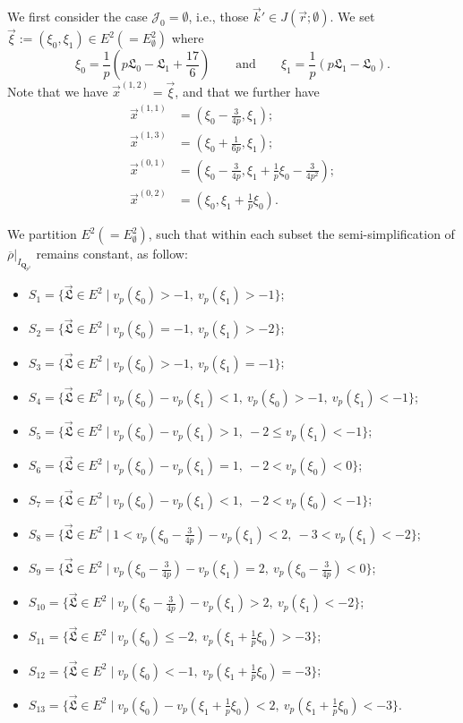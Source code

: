 \documentclass[11pt]{amsart}
\theoremstyle{definition}
\numberwithin{equation}{subsection}
\theoremstyle{plain}
\theoremstyle{plain}
\theoremstyle{plain}
\theoremstyle{plain}
\theoremstyle{plain}
\theoremstyle{plain}
\theoremstyle{plain}
\theoremstyle{plain}
\theoremstyle{plain}
\theoremstyle{plain}
\theoremstyle{plain}
\theoremstyle{plain}
\theoremstyle{definition}
\theoremstyle{definition}
\theoremstyle{definition}
\theoremstyle{remark}
\renewcommand{\(}{\textup{(}}
\renewcommand{\)}{\textup{)}}
\newcommand{\Q}{\mathbf{Q}}
\newcommand{\rhobar}{\overline{\rho}}
\newcommand{\fL}{\mathfrak{L}}
\newcommand{\cJ}{\mathcal{J}}
\newcommand{\vx}{\vec{x}}
\newcommand{\vr}{\vec{r}}
\newcommand{\vL}{\vec{\fL}}
\newcommand{\vk}{\vec{k}}
\begin{document}
We first consider the case $\cJ_0=\emptyset$, i.e., those $\vk'\in J(\vr;\emptyset)$. We set $\vec{\xi}:=(\xi_0,\xi_1)\in E^2(=E^2_\emptyset)$ where
$$\xi_0=\frac{1}{p}\left(p\fL_0-\fL_1+\frac{17}{6}\right) \qquad\mbox{and}\qquad \xi_1=\frac{1}{p}(p\fL_1-\fL_0).$$
Note that we have $\vx^{(1,2)}=\vec{\xi}$, and that we further have
\begin{align*}
\vx^{(1,1)}&=\left(\xi_0-\tfrac{3}{4p},\xi_1\right);\\
\vx^{(1,3)}&=\left(\xi_0+\tfrac{1}{6p},\xi_1\right);\\ 
\vx^{(0,1)}&=\left(\xi_0-\tfrac{3}{4p},\xi_1+\tfrac{1}{p}\xi_0-\tfrac{3}{4p^2}\right);\\
\vx^{(0,2)}&=\left(\xi_0,\xi_1+\tfrac{1}{p}\xi_0\right).
\end{align*}

We partition $E^2(=E^2_\emptyset)$, such that within each subset the semi-simplification of $\rhobar|_{I_{\Q_{p^2}}}$ remains constant, as follow:
\begin{itemize}[leftmargin=*]
\item $S_1=\{\vL\in E^2\mid v_p(\xi_0)>-1,\ v_p(\xi_1)>-1\}$;
\item $S_2=\{\vL\in E^2\mid v_p(\xi_0)=-1,\ v_p(\xi_1)>-2\}$;
\item $S_3=\{\vL\in E^2\mid v_p(\xi_0)>-1,\ v_p(\xi_1)=-1\}$;
\item $S_4=\{\vL\in E^2\mid  v_p(\xi_0)-v_p(\xi_1)<1,\ v_p(\xi_0)>-1,\ v_p(\xi_1)<-1\}$;
\item $S_5=\{\vL\in E^2\mid v_p(\xi_0)-v_p(\xi_1)>1,\ -2\leq v_p(\xi_1)<-1\}$;
\item $S_6=\{\vL\in E^2\mid v_p(\xi_0)-v_p(\xi_1)=1,\ -2<v_p(\xi_0)<0\}$;
\item $S_7=\{\vL\in E^2\mid v_p(\xi_0)-v_p(\xi_1)<1,\ -2<v_p(\xi_0)<-1\}$;
\item $S_8=\{\vL\in E^2\mid 1<v_p(\xi_0-\tfrac{3}{4p})-v_p(\xi_1)<2,\ -3<v_p(\xi_1)<-2\}$;
\item $S_9=\{\vL\in E^2\mid v_p(\xi_0-\tfrac{3}{4p})-v_p(\xi_1)=2,\ v_p(\xi_0-\tfrac{3}{4p})<0\}$;
\item $S_{10}=\{\vL\in E^2\mid v_p(\xi_0-\tfrac{3}{4p})-v_p(\xi_1)>2,\ v_p(\xi_1)<-2\}$;
\item $S_{11}=\{\vL\in E^2\mid v_p(\xi_0)\leq -2,\ v_p(\xi_1+\tfrac{1}{p}\xi_0)>-3\}$;
\item $S_{12}=\{\vL\in E^2\mid v_p(\xi_0)<-1,\ v_p(\xi_1+\tfrac{1}{p}\xi_0)=-3\}$;
\item $S_{13}=\{\vL\in E^2\mid v_p(\xi_0)-v_p(\xi_1+\tfrac{1}{p}\xi_0)<2,\ v_p(\xi_1+\tfrac{1}{p}\xi_0)<-3\}$.
\end{itemize}
\end{document}
